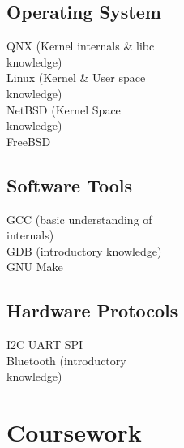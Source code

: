 \documentclass[letterpaper, 10pt]{deedy-resume} %
\begin{document}
{\begin{minipage}[t]{0.30\textwidth}
\sectionspace

\subsection{Operating System}
\textbullet{} QNX (Kernel internals \& libc \\
\hspace{2mm} knowledge) \\
\textbullet{} Linux (Kernel \& User space \\
\hspace{2mm} knowledge) \\
\textbullet{} NetBSD (Kernel Space \\
\hspace{2mm} knowledge) \\
\textbullet{} FreeBSD \\
\sectionspace %
\subsection{Software Tools}
\textbullet{} GCC (basic understanding of \\
\hspace{2mm} internals) \\ 
\textbullet{} GDB (introductory knowledge)\\
\textbullet{} GNU Make \\

\sectionspace %

\subsection{Hardware Protocols}

\textbullet{} I2C \textbullet{} UART \textbullet{} SPI \\
\textbullet{} Bluetooth (introductory \\ 
\hspace{2mm} knowledge) \\
\sectionspace %


\section{Coursework}


\end{minipage}}
\end{document}
